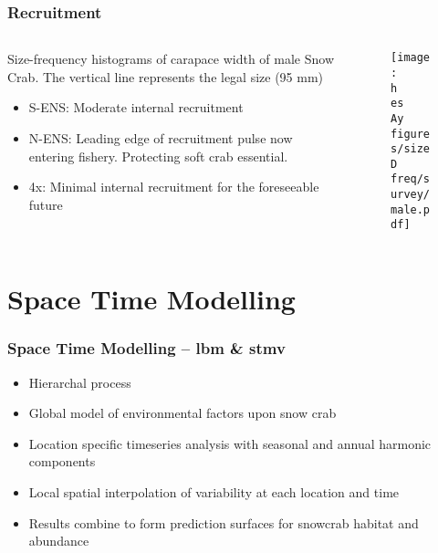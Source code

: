 \documentclass{beamer}
\numberwithin{equation}{section}		%
\numberwithin{figure}{section}	   	%
\numberwithin{table}{section}				%
\newcommand{\D}{.}  %
\newcommand{\h}{C:/} %
\newcommand{\es}{bio.data/bio.snowcrab/} %
\newcommand{\Ay}{assessments/2017/}
\begin{document}
\begin{frame}
\frametitle{Recruitment}
\begin{columns}
	\begin{column}{0.5\textwidth}
		Size-frequency histograms of carapace width of male Snow Crab. The vertical line represents the legal size (95 mm)
		\begin{itemize}
			\item S-ENS: Moderate internal recruitment
			\item N-ENS: Leading edge of recruitment pulse now entering fishery. Protecting soft crab essential.
			\item 4x: Minimal internal recruitment for the foreseeable future  
		\end{itemize}
	\end{column}
	
	\begin{column}{0.5\textwidth}
		\begin{figure}
			\texttt{[image: \\h \\es \\Ay figures/size\\D freq/survey/male.pdf]}
		\end{figure}
	\end{column}
\end{columns}
\end{frame}




\section{Space Time Modelling}
\begin{frame}
\frametitle{Space Time Modelling --  lbm \& stmv}

\begin{itemize}
	\item Hierarchal process
	\item Global model of environmental factors upon snow crab
	\item Location specific timeseries analysis with seasonal and annual harmonic components
	\item Local spatial interpolation of variability at each location and time
	\item Results combine to form prediction surfaces for snowcrab habitat and abundance
\end{itemize}
\end{frame}
\end{document}
